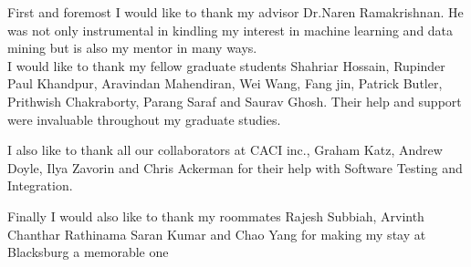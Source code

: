 \vspace*{\fill}
\Large{First and foremost I would like to thank my advisor Dr.Naren Ramakrishnan. He was not only instrumental in kindling my interest in machine learning and data mining but is also my mentor in many ways.\\
I would like to thank my fellow graduate students Shahriar Hossain, Rupinder Paul Khandpur, Aravindan Mahendiran, Wei Wang, Fang jin, Patrick Butler, Prithwish Chakraborty, Parang Saraf and Saurav Ghosh. Their help and support were invaluable throughout my graduate studies.

I also like to thank all our collaborators at CACI inc., Graham Katz, Andrew Doyle, Ilya Zavorin and Chris Ackerman for their help with Software Testing and Integration.

Finally I would also like to thank my roommates Rajesh Subbiah, Arvinth Chanthar Rathinama Saran Kumar and Chao Yang for making my stay at Blacksburg a memorable one
}
\vspace{\fill}

